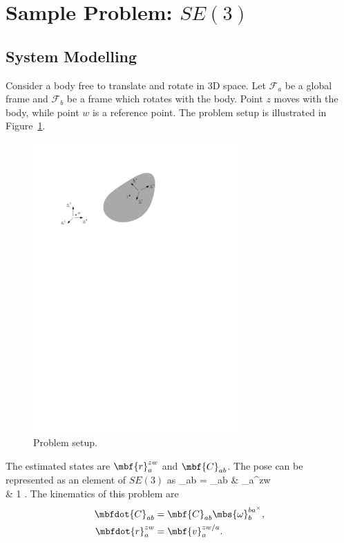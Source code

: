 \section{\NoAutoSpacing Sample Problem: $SE(3)$}

\subsection{System Modelling}

Consider a body free to translate and rotate in 3D space. Let $\mathcal{F}_a$ be a global frame and $\mathcal{F}_b$ be a frame which rotates with the body. Point $z$ moves with the body, while point $w$ is a reference point. The problem setup is illustrated in Figure~\ref{fig:se3_prob}.
\begin{figure}
	\centering
	\includegraphics[width=0.7\textwidth]{figs/prob.pdf}
	\caption[Problem setup.]{Problem setup.}
	\label{fig:se3_prob}
\end{figure}
The estimated states are $\mbf{r}_a^{zw}$ and $\mbf{C}_{ab}$. The pose can be represented as an element of $SE(3)$ as
\bdis
	_{ab} = 
		_{ab} & _a^{zw} \\
		 & 1
	\ema.
\edis The kinematics of this problem are
\begin{align*}
	\mbfdot{C}_{ab} &= \mbf{C}_{ab} \mbs{\omega}_b^{{ba}^\times}, \\
	\mbfdot{r}_a^{zw} &= \mbf{v}_a^{zw/a}.
\end{align*}
